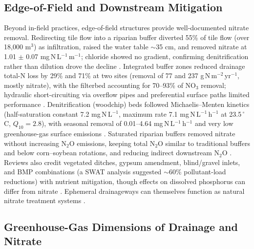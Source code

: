 \documentclass[11pt]{article}
\begin{document}
\subsection{Edge-of-Field and Downstream Mitigation}

Beyond in-field practices, edge-of-field structures provide well-documented nitrate removal. Redirecting tile flow into a riparian buffer diverted 55\% of tile flow (over 18,000 m$^3$) as infiltration, raised the water table $\sim$35 cm, and removed nitrate at 1.01 $\pm$ 0.07 mg\,N\,L$^{-1}$\,m$^{-1}$; chloride showed no gradient, confirming denitrification rather than dilution drove the decline \parencite{Jaynes2014}. Integrated buffer zones reduced drainage total-N loss by 29\% and 71\% at two sites (removal of 77 and 237 g\,N\,m$^{-2}$\,yr$^{-1}$, mostly nitrate), with the filterbed accounting for 70--93\% of NO$_3$ removal; hydraulic short-circuiting via overflow pipes and preferential surface paths limited performance \parencite{Carstensen2021}. Denitrification (woodchip) beds followed Michaelis--Menten kinetics (half-saturation constant 7.2 mg\,N\,L$^{-1}$, maximum rate 7.1 mg\,N\,L$^{-1}$\,h$^{-1}$ at 23.5\,$^{\circ}$C, $Q_{10}=2.8$), with seasonal removal of 0.01--4.64 mg\,N\,L$^{-1}$\,h$^{-1}$ and very low greenhouse-gas surface emissions \parencite{Ghane2015}. Saturated riparian buffers removed nitrate without increasing N$_2$O emissions, keeping total N$_2$O similar to traditional buffers and below corn--soybean rotations, and reducing indirect downstream N$_2$O \parencite{Davis2019}. Reviews also credit vegetated ditches, gypsum amendment, blind/gravel inlets, and BMP combinations (a SWAT analysis suggested $\sim$60\% pollutant-load reductions) with nutrient mitigation, though effects on dissolved phosphorus can differ from nitrate \parencite{Ward2018}. Ephemeral drainageways can themselves function as natural nitrate treatment systems \parencite{Schilling2007}.

\subsection{Greenhouse-Gas Dimensions of Drainage and Nitrate}
\end{document}
